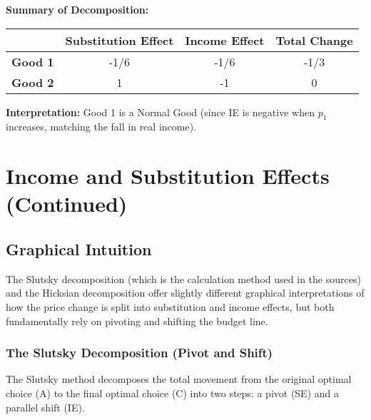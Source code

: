\documentclass{article}
\begin{document}
\textbf{Summary of Decomposition:}
\begin{center}
\begin{tabular}{@{}lccc@{}}
\toprule
 & Substitution Effect & Income Effect & Total Change \\
\midrule
\textbf{Good 1} & -1/6 & -1/6 & -1/3 \\
\textbf{Good 2} & 1 & -1 & 0 \\
\bottomrule
\end{tabular}
\end{center}

\textbf{Interpretation:} Good 1 is a Normal Good (since IE is negative when $p_1$ increases, matching the fall in real income).

\hrulefill

\section{Income and Substitution Effects (Continued)}
\subsection{Graphical Intuition}

The Slutsky decomposition (which is the calculation method used in the sources) and the Hicksian decomposition offer slightly different graphical interpretations of how the price change is split into substitution and income effects, but both fundamentally rely on pivoting and shifting the budget line.

\subsubsection*{The Slutsky Decomposition (Pivot and Shift)}

The Slutsky method decomposes the total movement from the original optimal choice (A) to the final optimal choice (C) into two steps: a pivot (SE) and a parallel shift (IE).
\end{document}
